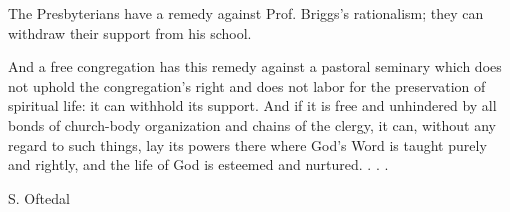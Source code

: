 The Presbyterians have a remedy against Prof. Briggs’s rationalism; they can withdraw their support from his school.

And a free congregation has this remedy against a pastoral seminary which does not uphold the congregation’s right and does not labor for the preservation of spiritual life: it can withhold its support. And if it is free and unhindered by all bonds of church-body organization and chains of the clergy, it can, without any regard to such things, lay its powers there where God’s Word is taught purely and rightly, and the life of God is esteemed and nurtured. . . .

S. Oftedal
